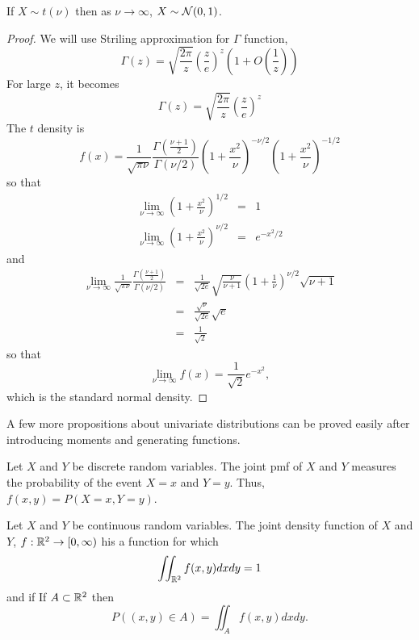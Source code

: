 \documentclass{article}
\begin{document}
\begin{prop}\label{c2p4}
If $X \sim t(\nu)$ then as $\nu \rightarrow \infty$, $X \sim \mathcal{N}(0, 1)$.
\end{prop}
\begin{proof}
We will use Striling approximation for $\Gamma$ function,
\begin{equation}\label{c2e22}
\Gamma(z) = \sqrt{\frac{2\pi}{z}}\left(\frac{z}{e}\right)^z
			\left(1 + O\left(\frac{1}{z}\right)\right)
\end{equation}
For large $z$, it becomes
\[
\Gamma(z) = \sqrt{\frac{2\pi}{z}}\left(\frac{z}{e}\right)^z
\]
The $t$ density is
\[
f(x) = \frac{1}{\sqrt{\pi\nu}}\frac{\Gamma(\frac{\nu+1}{2})}{\Gamma(\nu/2)}
	\left(1 + \frac{x^2}{\nu}\right)^{-\nu/2}\left(1 + \frac{x^2}{\nu}\right)^{-1/2}
\]
so that
\begin{eqnarray*}
\lim_{\nu\rightarrow\infty}\left(1 + \frac{x^2}{\nu}\right)^{1/2} &=& 1 \\
\lim_{\nu\rightarrow\infty}\left(1 + \frac{x^2}{\nu}\right)^{\nu/2} &=& e^{-x^2/2}
\end{eqnarray*}
and
\begin{eqnarray*}
\lim_{\nu\rightarrow\infty}\frac{1}{\sqrt{\pi\nu}}
\frac{\Gamma(\frac{\nu+1}{2})}{\Gamma(\nu/2)} &=& \frac{1}{\sqrt{2e}}
\sqrt{\frac{\nu}{\nu+1}}\left(1 + \frac{1}{\nu}\right)^{\nu/2}\sqrt{\nu+1} \\
 &=& \frac{\sqrt{\nu}}{\sqrt{2e}}\sqrt{e} \\
 &=& \frac{1}{\sqrt{2}}
\end{eqnarray*}
so that
\[
\lim_{\nu\rightarrow\infty}f(x) = \frac{1}{\sqrt{2}}e^{-x^2},
\]
which is the standard normal density.
\end{proof}

A few more propositions about univariate distributions can be proved easily after
introducing moments and generating functions.

\begin{defn}\label{c2d11}
Let $X$ and $Y$ be discrete random variables. The joint pmf of $X$ and $Y$ 
measures the probability of the event $X = x$ and $Y = y$. Thus,
$f(x, y) = P(X = x, Y = y)$.
\end{defn}

\begin{defn}\label{c2d12}
Let $X$ and $Y$ be continuous random variables. The joint density function of
$X$ and $Y$, $f: \mathbb{R}^2 \rightarrow [0, \infty)$ his a function for which
\[
\iint_{\mathbb{R}^2} f(x, y)dxdy = 1
\]
and if If $A \subset \mathbb{R}^2$ then
\[
P((x, y) \in A) = \iint_A f(x, y)dxdy.
\]
\end{defn}
\end{document}
